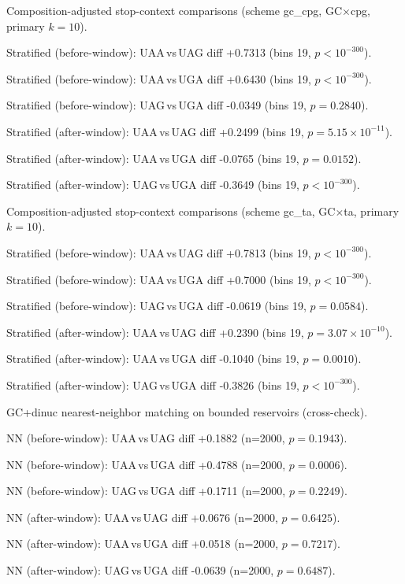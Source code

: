 Composition-adjusted stop-context comparisons (scheme gc\_cpg, GC$\times$cpg, primary $k=10$).

Stratified (before-window): UAA$\,$vs$\,$UAG diff +0.7313 (bins 19, $p<10^{-300}$).

Stratified (before-window): UAA$\,$vs$\,$UGA diff +0.6430 (bins 19, $p<10^{-300}$).

Stratified (before-window): UAG$\,$vs$\,$UGA diff -0.0349 (bins 19, $p=0.2840$).

Stratified (after-window): UAA$\,$vs$\,$UAG diff +0.2499 (bins 19, $p=5.15\times 10^{-11}$).

Stratified (after-window): UAA$\,$vs$\,$UGA diff -0.0765 (bins 19, $p=0.0152$).

Stratified (after-window): UAG$\,$vs$\,$UGA diff -0.3649 (bins 19, $p<10^{-300}$).

Composition-adjusted stop-context comparisons (scheme gc\_ta, GC$\times$ta, primary $k=10$).

Stratified (before-window): UAA$\,$vs$\,$UAG diff +0.7813 (bins 19, $p<10^{-300}$).

Stratified (before-window): UAA$\,$vs$\,$UGA diff +0.7000 (bins 19, $p<10^{-300}$).

Stratified (before-window): UAG$\,$vs$\,$UGA diff -0.0619 (bins 19, $p=0.0584$).

Stratified (after-window): UAA$\,$vs$\,$UAG diff +0.2390 (bins 19, $p=3.07\times 10^{-10}$).

Stratified (after-window): UAA$\,$vs$\,$UGA diff -0.1040 (bins 19, $p=0.0010$).

Stratified (after-window): UAG$\,$vs$\,$UGA diff -0.3826 (bins 19, $p<10^{-300}$).

GC+dinuc nearest-neighbor matching on bounded reservoirs (cross-check).

NN (before-window): UAA$\,$vs$\,$UAG diff +0.1882 (n=2000, $p=0.1943$).

NN (before-window): UAA$\,$vs$\,$UGA diff +0.4788 (n=2000, $p=0.0006$).

NN (before-window): UAG$\,$vs$\,$UGA diff +0.1711 (n=2000, $p=0.2249$).

NN (after-window): UAA$\,$vs$\,$UAG diff +0.0676 (n=2000, $p=0.6425$).

NN (after-window): UAA$\,$vs$\,$UGA diff +0.0518 (n=2000, $p=0.7217$).

NN (after-window): UAG$\,$vs$\,$UGA diff -0.0639 (n=2000, $p=0.6487$).

